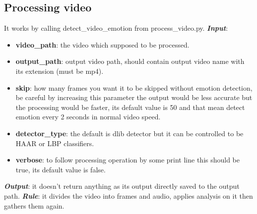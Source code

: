 \subsection{Processing video}
It works by calling detect\_video\_emotion from process\_video.py.
\newline \textbf{\textit{Input}}: 
\begin{itemize}
\item  \textbf{video\_path}: the video which supposed to be processed.
\item  \textbf{output\_path}: output video path, should contain output video name with its extension (must be mp4).
\item  \textbf{skip}: how many frames you want it to be skipped without emotion detection, be careful by increasing this parameter the output would be less accurate but the processing would be faster, its default value is 50 and that mean detect emotion every 2 seconds in normal video speed.
\item \textbf{detector\_type}: the default is dlib detector but it can be controlled to be HAAR or LBP classifiers.
\item  \textbf{verbose}: to follow processing operation by some print line this should be true, its default value is false.
\end{itemize}
\newline \textbf{\textit{Output}}: it doesn't return anything as its output directly saved to the output path.
\newline\textbf{\textit{ Rule}}: it divides the video into frames and audio, applies analysis on it then gathers them again.
\newline 